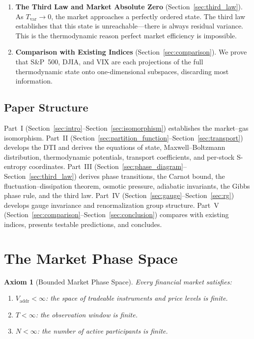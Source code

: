 \documentclass[twocolumn,10pt]{article}
\newtheorem{axiom}{Axiom}
\theoremstyle{remark}
\newcommand{\Tvar}{T_{\mathrm{var}}}
\newcommand{\Vaddr}{V_{\mathrm{addr}}}
\newcommand{\secref}[1]{Section~\ref{#1}}
\begin{document}
\begin{enumerate}[label=\arabic*.]
    \item \textbf{The Third Law and Market Absolute Zero} (\secref{sec:third_law}).  As $\Tvar \to 0$, the market approaches a perfectly ordered state.  The third law establishes that this state is unreachable---there is always residual variance.  This is the thermodynamic reason perfect market efficiency is impossible.

    \item \textbf{Comparison with Existing Indices} (\secref{sec:comparison}).  We prove that S\&P~500, DJIA, and VIX are each projections of the full thermodynamic state onto one-dimensional subspaces, discarding most information.
\end{enumerate}

\subsection{Paper Structure}

Part~I (\secref{sec:intro}--\secref{sec:isomorphism}) establishes the market--gas isomorphism.  Part~II (\secref{sec:partition_function}--\secref{sec:transport}) develops the DTI and derives the equations of state, Maxwell--Boltzmann distribution, thermodynamic potentials, transport coefficients, and per-stock S-entropy coordinates.  Part~III (\secref{sec:phase_diagram}--\secref{sec:third_law}) derives phase transitions, the Carnot bound, the fluctuation--dissipation theorem, osmotic pressure, adiabatic invariants, the Gibbs phase rule, and the third law.  Part~IV (\secref{sec:gauge}--\secref{sec:rg}) develops gauge invariance and renormalization group structure.  Part~V (\secref{sec:comparison}--\secref{sec:conclusion}) compares with existing indices, presents testable predictions, and concludes.


\section{The Market Phase Space}
\label{sec:phase_space}

\begin{axiom}[Bounded Market Phase Space]
\label{ax:bounded_market}
Every financial market satisfies:
\begin{enumerate}[label=(\alph*)]
    \item $\Vaddr < \infty$: the space of tradeable instruments and price levels is finite.
    \item $T < \infty$: the observation window is finite.
    \item $N < \infty$: the number of active participants is finite.
\end{enumerate}
\end{axiom}
\end{document}

